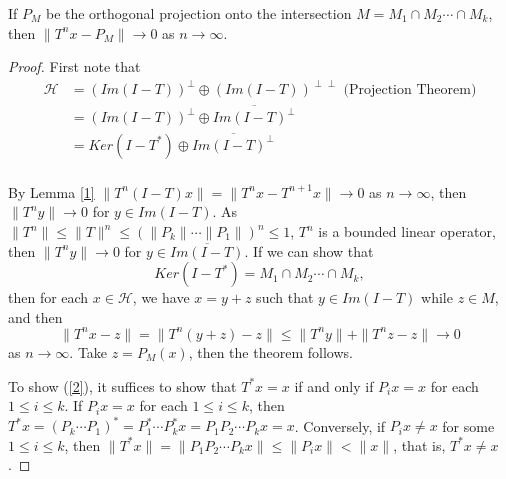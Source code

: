 \begin{theorem}
If $P_{M}$ be the orthogonal projection onto the intersection $M=M_1\cap M_2\cdots \cap M_k$, then $\|T^n x-P_{M}\|\rightarrow 0$ as $n\rightarrow\infty.$
\begin{proof}
First note that
\begin{align*}
\mathcal{H}&=\left(Im(I-T)\right)^{\perp}\oplus\left(Im(I-T)\right)^{\perp\perp} \mbox{ (Projection Theorem)}\\
&=\left(Im(I-T)\right)^{\perp}\oplus\overline{Im(I-T)^{\perp}}\\
&=Ker(I-T^{\ast})\oplus\overline{Im(I-T)^{\perp}}\\
\end{align*}

By Lemma \ref{1} $\|T^n(I-T)x\|=\|T^n x-T^{n+1}x\|\rightarrow 0$ as $n\rightarrow\infty$, then $\|T^n y\|\rightarrow 0$ for $y\in Im(I-T)$. As $\|T^n\|\leq\|T\|^n\leq (\|P_k\|\cdots \|P_1\|)^n\leq 1$, $T^n$ is a bounded linear operator, then $\|T^n y\|\rightarrow 0$ for $y\in \overline{Im(I-T)}$.
If we can show that
\begin{equation}\label{2}
Ker(I-T^{\ast})=M_1\cap M_2\cdots \cap M_k,
\end{equation} 
then for each $x\in \mathcal{H}$, we have $x=y+z$ such that $y\in Im(I-T)$ while $z\in M$, and then
$$\|T^n x-z\|=\|T^n(y+z)-z\|\leq \|T^n y\|+\|T^n z-z\|\rightarrow 0 $$
as $n\rightarrow \infty$.
Take $z=P_M(x)$, then the theorem follows.

\par
To show (\ref{2}), it suffices to show that $T^{\ast}x=x$ if and only if $P_i x=x$ for each $1\leq i\leq k$. If $P_i x=x$ for each $1\leq i\leq k$, then $T^{\ast}x=(P_k\cdots P_1)^{\ast}=P_1^{\ast}\cdots P_k^{\ast}x=P_1P_2\cdots P_k x=x$. Conversely, if $P_ix\neq x$ for some $1\leq i\leq k$, then $\|T^{\ast}x\|=\|P_1P_2\cdots P_k x\|\leq \|P_i x\|< \|x\|$, that is, $T^{\ast}x\neq x$.
\end{proof}

\end{theorem}

 
